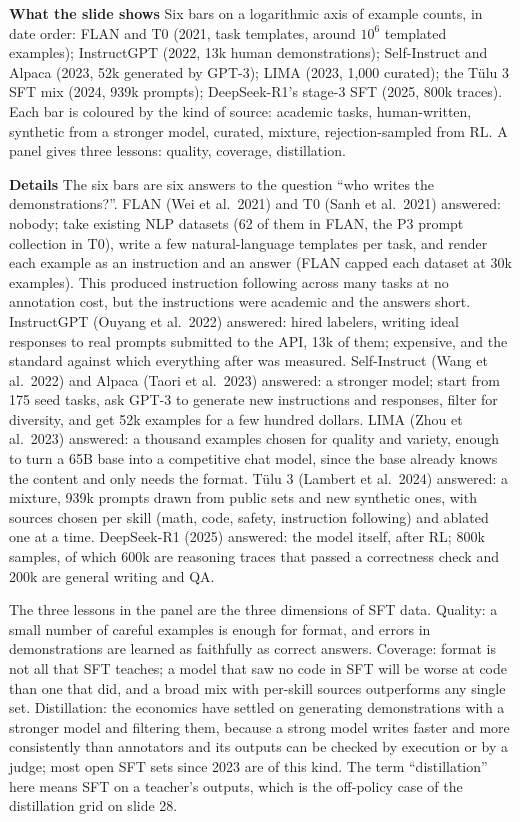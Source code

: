 \documentclass[11pt,letterpaper]{article}
\newcommand{\para}[1]{\medskip\noindent\textbf{#1}\quad}
\begin{document}
\para{What the slide shows} Six bars on a logarithmic axis of example counts, in date order: FLAN and T0 (2021, task templates, around $10^{6}$ templated examples); InstructGPT (2022, 13k human demonstrations); Self-Instruct and Alpaca (2023, 52k generated by GPT-3); LIMA (2023, 1,000 curated); the Tülu 3 SFT mix (2024, 939k prompts); DeepSeek-R1's stage-3 SFT (2025, 800k traces). Each bar is coloured by the kind of source: academic tasks, human-written, synthetic from a stronger model, curated, mixture, rejection-sampled from RL. A panel gives three lessons: quality, coverage, distillation.

\para{Details} The six bars are six answers to the question ``who writes the demonstrations?''. FLAN (Wei et al.\ 2021) and T0 (Sanh et al.\ 2021) answered: nobody; take existing NLP datasets (62 of them in FLAN, the P3 prompt collection in T0), write a few natural-language templates per task, and render each example as an instruction and an answer (FLAN capped each dataset at 30k examples). This produced instruction following across many tasks at no annotation cost, but the instructions were academic and the answers short. InstructGPT (Ouyang et al.\ 2022) answered: hired labelers, writing ideal responses to real prompts submitted to the API, 13k of them; expensive, and the standard against which everything after was measured. Self-Instruct (Wang et al.\ 2022) and Alpaca (Taori et al.\ 2023) answered: a stronger model; start from 175 seed tasks, ask GPT-3 to generate new instructions and responses, filter for diversity, and get 52k examples for a few hundred dollars. LIMA (Zhou et al.\ 2023) answered: a thousand examples chosen for quality and variety, enough to turn a 65B base into a competitive chat model, since the base already knows the content and only needs the format. Tülu 3 (Lambert et al.\ 2024) answered: a mixture, 939k prompts drawn from public sets and new synthetic ones, with sources chosen per skill (math, code, safety, instruction following) and ablated one at a time. DeepSeek-R1 (2025) answered: the model itself, after RL; 800k samples, of which 600k are reasoning traces that passed a correctness check and 200k are general writing and QA.

The three lessons in the panel are the three dimensions of SFT data. Quality: a small number of careful examples is enough for format, and errors in demonstrations are learned as faithfully as correct answers. Coverage: format is not all that SFT teaches; a model that saw no code in SFT will be worse at code than one that did, and a broad mix with per-skill sources outperforms any single set. Distillation: the economics have settled on generating demonstrations with a stronger model and filtering them, because a strong model writes faster and more consistently than annotators and its outputs can be checked by execution or by a judge; most open SFT sets since 2023 are of this kind. The term ``distillation'' here means SFT on a teacher's outputs, which is the off-policy case of the distillation grid on slide 28.
\end{document}
